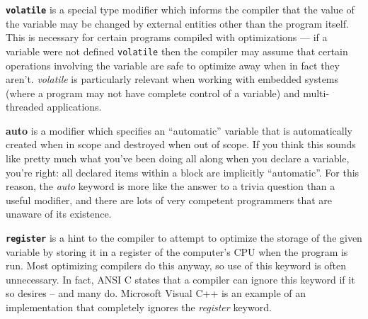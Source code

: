\textbf{\texttt{volatile}} is a special type modifier which informs the
compiler that the value of the variable may be changed by external entities
other than the program itself. This is necessary for certain programs compiled
with optimizations --- if a variable were not defined \texttt{volatile} then
the compiler may assume that certain operations involving the variable are safe
to optimize away when in fact they aren't. \emph{volatile} is particularly
relevant when working with embedded systems (where a program may not have
complete control of a variable) and multi-threaded applications.

\textbf{auto} is a modifier which specifies an ``automatic'' variable that is
automatically created when in scope and destroyed when out of scope. If you
think this sounds like pretty much what you've been doing all along when you
declare a variable, you're right: all declared items within a block are
implicitly ``automatic''. For this reason, the \emph{auto} keyword is more like
the answer to a trivia question than a useful modifier, and there are lots of
very competent programmers that are unaware of its existence.

\textbf{\texttt{register}} is a hint to the compiler to attempt to optimize the
storage of the given variable by storing it in a register of the computer's CPU
when the program is run. Most optimizing compilers do this anyway, so use of
this keyword is often unnecessary. In fact, ANSI C states that a compiler can
ignore this keyword if it so desires -- and many do. Microsoft Visual C++ is an
example of an implementation that completely ignores the \emph{register}
keyword.
